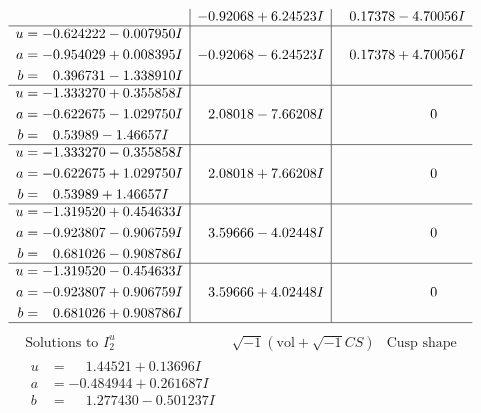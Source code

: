 \documentclass[1p]{elsarticle_modified}
\theoremstyle{definition}
\newcommand{\I}{\sqrt{-1}}
\begin{document}
$$\begin{array}{c|c|c}
 & -0.92068 + 6.24523 I & \phantom{-}0.17378 - 4.70056 I \\ \hline\begin{aligned}
u &= -0.624222 - 0.007950 I \\
a &= -0.954029 + 0.008395 I \\
b &= \phantom{-}0.396731 - 1.338910 I\end{aligned}
 & -0.92068 - 6.24523 I & \phantom{-}0.17378 + 4.70056 I \\ \hline\begin{aligned}
u &= -1.333270 + 0.355858 I \\
a &= -0.622675 - 1.029750 I \\
b &= \phantom{-}0.53989 - 1.46657 I\end{aligned}
 & \phantom{-}2.08018 - 7.66208 I & \phantom{-0.000000 } 0 \\ \hline\begin{aligned}
u &= -1.333270 - 0.355858 I \\
a &= -0.622675 + 1.029750 I \\
b &= \phantom{-}0.53989 + 1.46657 I\end{aligned}
 & \phantom{-}2.08018 + 7.66208 I & \phantom{-0.000000 } 0 \\ \hline\begin{aligned}
u &= -1.319520 + 0.454633 I \\
a &= -0.923807 - 0.906759 I \\
b &= \phantom{-}0.681026 - 0.908786 I\end{aligned}
 & \phantom{-}3.59666 - 4.02448 I & \phantom{-0.000000 } 0 \\ \hline\begin{aligned}
u &= -1.319520 - 0.454633 I \\
a &= -0.923807 + 0.906759 I \\
b &= \phantom{-}0.681026 + 0.908786 I\end{aligned}
 & \phantom{-}3.59666 + 4.02448 I & \phantom{-0.000000 } 0\\
 \hline 
 \end{array}$$\newpage$$\begin{array}{c|c|c}  
\text{Solutions to }I^u_{2}& \I (\text{vol} + \sqrt{-1}CS) & \text{Cusp shape}\\
 \hline 
\begin{aligned}
u &= \phantom{-}1.44521 + 0.13696 I \\
a &= -0.484944 + 0.261687 I \\
b &= \phantom{-}1.277430 - 0.501237 I\end{aligned}

\end{array}$$
\end{document}

